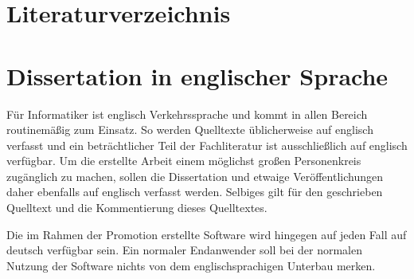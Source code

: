 \documentclass[paper=a4,fontsize=11pt,parskip=half]{scrartcl}
\begin{document}
\newpage

\section{Literaturverzeichnis}
\printbibliography[heading=none]

\newpage
\appendix

\section{Dissertation in englischer Sprache}

Für Informatiker ist englisch Verkehrssprache und kommt in allen Bereich routinemäßig zum Einsatz. So werden Quelltexte üblicherweise auf englisch verfasst und ein beträchtlicher Teil der Fachliteratur ist ausschließlich auf englisch verfügbar. Um die erstellte Arbeit einem möglichst großen Personenkreis zugänglich zu machen, sollen die Dissertation und etwaige Veröffentlichungen daher ebenfalls  auf englisch verfasst werden. Selbiges gilt für den geschrieben Quelltext und die Kommentierung dieses Quelltextes.

Die im Rahmen der Promotion erstellte Software wird hingegen auf jeden Fall auf deutsch verfügbar sein. Ein normaler Endanwender soll bei der normalen Nutzung der Software nichts von dem englischsprachigen Unterbau merken.
\end{document}
